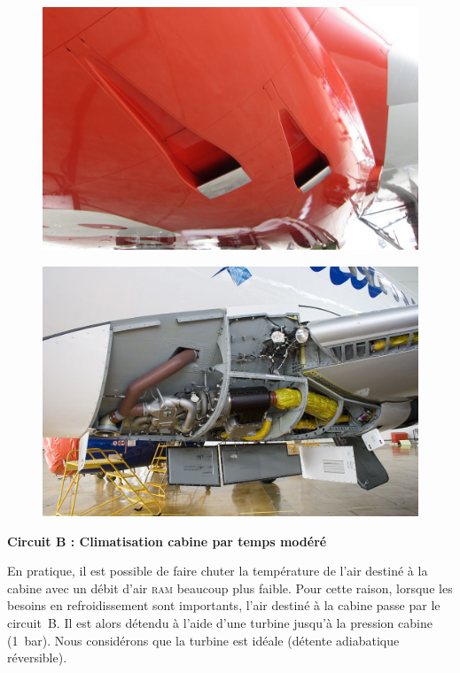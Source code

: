 	\begin{figure}
		\begin{center}
			\includegraphics[height=.35\textwidth]{images/ram_pack_air_intakes_747.jpg}
		\end{center}
		\label{fig_747_ram_intake}
	\end{figure}
	
	\begin{figure}
		\begin{center}
			\includegraphics[width=.8\textwidth]{images/pack_sukhoi.jpg}
		\end{center}
		\label{fig_pack_ssj}
	\end{figure}


\textbf{Circuit B : Climatisation cabine par temps modéré}

	En pratique, il est possible de faire chuter la température de l’air destiné à la cabine avec un débit d’air \textsc{ram} beaucoup plus faible. Pour cette raison, lorsque les besoins en refroidissement sont importants, l’air destiné à la cabine passe par le circuit~B. Il est alors détendu à l’aide d’une turbine jusqu’à la pression cabine (\SI{1}{\bar}).  Nous considérons que la turbine est idéale (détente adiabatique réversible).
	
